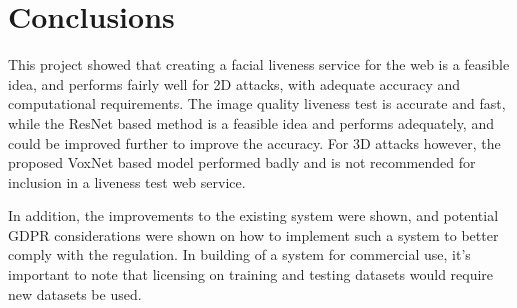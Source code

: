 \documentclass[11pt,a4paper]{article}
\begin{document}
\section{Conclusions}
    This project showed that creating a facial liveness service for the web is a feasible idea, and performs fairly well for 2D attacks, with adequate accuracy and computational requirements.
    The image quality liveness test is accurate and fast, while the ResNet based method is a feasible idea and performs adequately, and could be improved further to improve the accuracy. For 3D attacks however, the
    proposed VoxNet based model performed badly and is not recommended for inclusion in a liveness test web service.

    In addition, the improvements to the existing system were shown, and potential GDPR considerations were shown on how to implement such a system to better comply with the regulation. In building of a system for commercial use, it's important
    to note that licensing on training and testing datasets would require new datasets be used.



\end{document}
